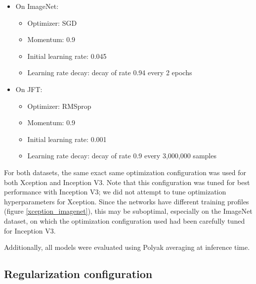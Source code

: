 \documentclass[10pt,twocolumn,letterpaper]{article}
\begin{document}
\begin{itemize}
\item On ImageNet:
  \begin{itemize}
  \item Optimizer: SGD
  \item Momentum: 0.9
  \item Initial learning rate: 0.045
  \item Learning rate decay: decay of rate 0.94 every 2 epochs
  \end{itemize}

\item On JFT:
  \begin{itemize}
  \item Optimizer: RMSprop \cite{rmsprop}
  \item Momentum: 0.9
  \item Initial learning rate: 0.001
  \item Learning rate decay: decay of rate 0.9 every 3,000,000 samples
  \end{itemize}

\end{itemize}

For both datasets, the same exact same optimization configuration was used for both Xception and Inception V3. Note that this configuration was tuned for best performance with Inception V3; we did not attempt to tune optimization hyperparameters for Xception. Since the networks have different training profiles (figure \ref{xception_imagenet}), this may be suboptimal, especially on the ImageNet dataset, on which the optimization configuration used had been carefully tuned for Inception V3.

Additionally, all models were evaluated using Polyak averaging \cite{polyak1992} at inference time.


\subsection{Regularization configuration}
\end{document}
